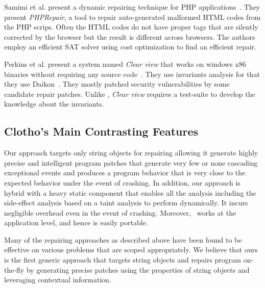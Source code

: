  Samimi et al. present a dynamic repairing
technique for PHP applications~\cite{SamirniSAMTH12}. They present
\textit{PHPRepair}, a tool to repair auto-generated malformed HTML codes from
the PHP scrips. Often the HTML codes do not have proper tags that are silently
corrected by the browser but the result is different across browsers. The
authors employ an efficient SAT solver using cost optimization to find an
efficient repair.

 Perkins et al. present a system named
\emph{Clear view} that works on windows x86 binaries without requiring any
source code~\cite{conf/sosp/PerkinsKLABCPSSSWZER09}. They use invariants
analysis for that they use Daikon~\cite{DBLP:journals/scp/ErnstPGMPTX07}. They
mostly patched security vulnerabilities by some candidate repair patches. Unlike
\tool, \emph{Clear view} requires a test-suite to develop the knowledge about
the invariants.

\subsection{Clotho's Main Contrasting Features}

Our approach targets only string objects for repairing allowing it generate
highly precise and intelligent program patches that generate very few or none
cascading exceptional events and produces a program behavior that is very close
to the expected behavior under the event of crashing. In addition, our approach
is hybrid with a heavy static component that enables all the analysis including
the side-effect analysis based on a taint analysis to perform dynamically. It
incurs negligible overhead even in the event of crashing. Moreover, \tool\ works
at the application level, and hence is easily portable.

Many of the repairing approaches as described above have been found to be
effective on various problems that are scoped appropriately. We believe that
ours is the first generic approach that targets string objects and repairs
program on-the-fly by generating precise patches using the properties of string
objects and leveraging contextual information.